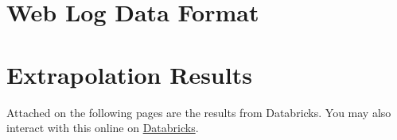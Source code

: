 \documentclass[12pt,titlepage]{article}
\begin{document}
\section{Web Log Data Format}
\label{apx:data_format}

\section{Extrapolation Results}
\label{apx:results}

Attached on the following pages are the results from Databricks. You may also interact with this online on \href{https://databricks-prod-cloudfront.cloud.databricks.com/public/4027ec902e239c93eaaa8714f173bcfc/7364378259770565/3552971541306612/8155742302574378/latest.html}{Databricks}.
\end{document}
